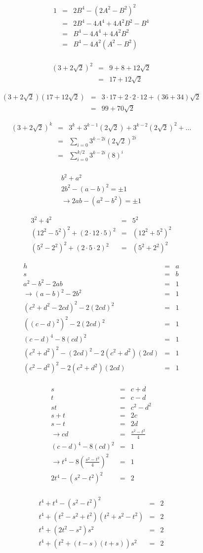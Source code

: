 \documentclass[aps,preprint,preprintnumbers,nofootinbib,showpacs,prd]{revtex4-1}
\newcommand{\nbea}{\begin{eqnarray*}}
\newcommand{\neea}{\end{eqnarray*}}
\begin{document}
%
\nbea
1 & = & 2B^4 - (2A^2 - B^2)^2 \\
& = & 2B^4 - 4A^4 + 4A^2B^2 - B^4 \\
& = & B^4 - 4A^4 + 4A^2B^2 \\
& = & B^4 - 4A^2(A^2 - B^2) \\
\neea
%


%
\nbea
(3 + 2\sqrt{2})^2 & = & 9 + 8 + 12\sqrt{2} \\
& = & 17 + 12\sqrt{2}
\neea
%

%
\nbea
(3 + 2\sqrt{2})(17 + 12\sqrt{2}) & = & 3\cdot 17 + 2\cdot2\cdot 12 + (36 + 34)\sqrt{2} \\
& = & 99 + 70\sqrt{2}
\neea
%


%
\nbea
(3 + 2\sqrt{2})^k & = & 3^k + 3^{k-1} (2\sqrt{2}) + 3^{k-2} (2\sqrt{2})^2 + \dots \\
& = & \sum_{i=0} 3^{k-2i}(2\sqrt{2})^{2i} \\
& = & \sum_{i=0}^{k/2} 3^{k-2i}(8)^{i} \\
\neea
%






%
\nbea
b^2 + a^2 \\
2b^2 - (a-b)^2 = \pm1 \\
\to 2ab - (a^2 - b^2) = \pm 1
\neea
%






%
\nbea
3^2 + 4^2 & = & 5^2 \\
(12^2 - 5^2)^2 + (2\cdot12\cdot5)^2 & = & (12^2 + 5^2)^2 \\
(5^2 - 2^2)^2 + (2\cdot 5 \cdot 2)^2 & = & (5^2 + 2^2)^2
\neea
%



%
\nbea
h & = & a \\
s & = & b \\
a^2 - b^2 - 2ab & = & 1 \\
\to (a-b)^2 - 2b^2 & = & 1 \\
(c^2 + d^2 - 2cd)^2 - 2(2cd)^2 & = & 1\\
((c-d)^2)^2 - 2(2cd)^2 & = & 1\\
(c-d)^4 - 8(cd)^2 & = & 1\\
%
(c^2 + d^2)^2 - (2cd)^2 - 2(c^2+d^2)(2cd) & = & 1 \\
(c^2 - d^2)^2 - 2(c^2+d^2)(2cd) & = & 1 \\
\neea
%


%
\nbea
s & = & c + d \\
t & = & c - d \\
st & = & c^2 - d^2 \\
s + t & = & 2c \\
s - t & = & 2d \\
\to cd & = & \frac{s^2 - t^2}{4} \\
(c-d)^4 - 8(cd)^2 & = & 1\\
\to t^4 - 8(\frac{s^2 - t^2}{4})^2 & = & 1\\
2t^4 - (s^2 - t^2)^2 & = & 2\\
\neea
%


%
\nbea
t^4 + t^4 - (s^2 - t^2)^2 & = & 2\\
t^4 + (t^2 - s^2 + t^2)(t^2 + s^2 - t^2) & = & 2\\
t^4 + (2t^2 - s^2)s^2 & = & 2 \\
t^4 + (t^2 + (t- s)(t+s))s^2 & = & 2
\neea
%
\end{document}
